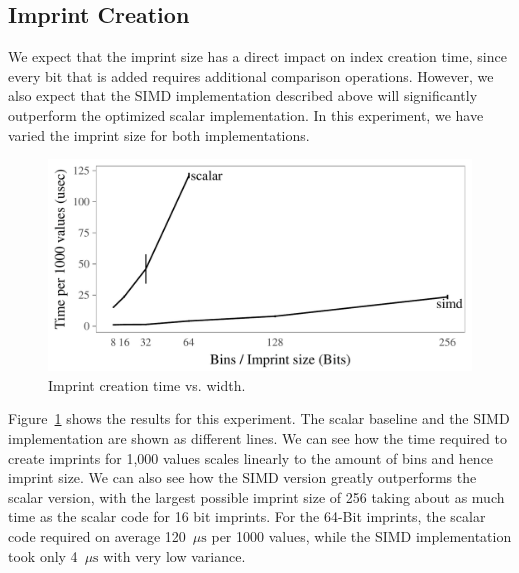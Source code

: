 \documentclass[sigconf]{acmart}
\begin{document}
\subsection{Imprint Creation}
We expect that the imprint size has a direct impact on index creation time, since every bit that is added requires additional comparison operations. However, we also expect that the SIMD implementation described above will significantly outperform the optimized scalar implementation. In this experiment, we have varied the imprint size for both implementations. 

\begin{figure}[ht]
\begin{center}
\includegraphics[width=\columnwidth,trim=0mm 0mm 0mm 0mm,clip]{scalebins1.pdf}
\end{center}
\caption{Imprint creation time vs. width.\label{fig:scalebins1}}
\end{figure}

Figure~\ref{fig:scalebins1} shows the results for this experiment. The scalar baseline and the SIMD implementation are shown as different lines. We can see how the time required to create imprints for 1,000 values scales linearly to the amount of bins and hence imprint size. We can also see how the SIMD version greatly outperforms the scalar version, with the largest possible imprint size of 256 taking about as much time as the scalar code for 16 bit imprints. For the 64-Bit imprints, the scalar code required on average 120~\(\mu\text{s}\) per 1000 values, while the SIMD implementation took only 4~\(\mu\text{s}\) with very low variance.
\end{document}
